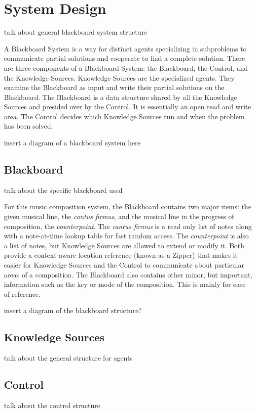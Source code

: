 \section{System Design}

talk about general blackboard system structure

A Blackboard System is a way for distinct agents specializing in subproblems to communicate partial solutions and cooperate to find a complete solution.
There are three components of a Blackboard System: the Blackboard, the Control, and the Knowledge Sources.
Knowledge Sources are the specialized agents. They examine the Blackboard as input and write their partial solutions on the Blackboard.
The Blackboard is a data structure shared by all the Knowledge Sources and presided over by the Control. It is essentially an open read and write area.
The Control decides which Knowledge Sources run and when the problem has been solved.

insert a diagram of a blackboard system here

\subsection{Blackboard}

talk about the specific blackboard used

For this music composition system, the Blackboard contains two major items: the given musical line, the \emph{cantus firmus}, and the musical line in the progress of composition, the \emph{counterpoint}.
The \emph{cantus firmus} is a read only list of notes along with a note-at-time lookup table for fast random access.
The \emph{counterpoint} is also a list of notes, but Knowledge Sources are allowed to extend or modify it.
Both provide a context-aware location reference (known as a Zipper) that makes it easier for Knowledge Sources and the Control to communicate about particular areas of a composition.
The Blackboard also contains other minor, but important, information such as the key or mode of the composition. This is mainly for ease of reference.

insert a diagram of the blackboard structure?

\subsection{Knowledge Sources}


talk about the general structure for agents
\subsection{Control}

talk about the control structure
